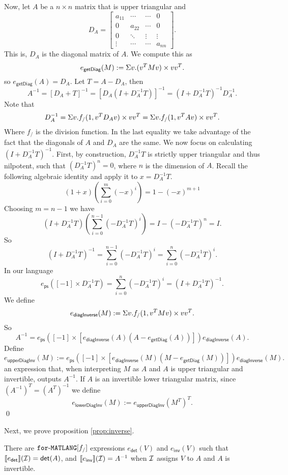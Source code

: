 Now, let $A$ be a $n\times n$ matrix that is upper triangular and
\[
D_A = \begin{bmatrix}
    a_{11} & \cdots & \cdots &  0 \\
    0 & a_{22} & \cdots &  0 \\
    0 & \ddots & \vdots & \vdots \\
    \vdots & \cdots& \cdots & a_{nn}
\end{bmatrix}.
\]
This is, $D_A$ is the diagonal matrix of $A$. We compute this as
$$
e_{\mathsf{getDiag}}(M) := \Sigma v. (v^TMv) \times vv^T.
$$
so $e_{\mathsf{getDiag}}(A)=D_A$.
Let $T=A-D_A$, then
$$
A^{-1}=\left[ D_A+T \right]^{-1}= \left[ D_A\left( I+D_A^{-1}T\right) \right]^{-1} = \left( I+D_A^{-1}T\right)^{-1}D_A^{-1}.
$$
Note that
$$
D_A^{-1}=\Sigma v. f_{/}(1,v^TD_Av)\times vv^T=\Sigma v. f_{/}(1,v^TAv)\times vv^T.
$$
Where $f_{/}$ is the division function. In the last equality we take advantage of the fact that the diagonals of $A$ and $D_A$ are the same.
We now focus on calculating $\left( I+D_A^{-1}T\right)^{-1}$. First, by construction, $D_A^{-1}T$ is strictly upper triangular and thus nilpotent, 
such that $\left( D_A^{-1}T\right)^n=0$, where $n$ is the dimension of $A$.
Recall the following algebraic identity and apply it to $x=D_A^{-1}T$. $$(1+x)\left( \sum_{i=0}^{m}(-x)^i \right)=1-(-x)^{m+1}$$
Choosing $m=n-1$ we have
$$
\left(I+D_A^{-1}T \right)\left( \sum_{i=0}^{n-1}(-D_A^{-1}T)^i \right)=I- \left( -D_A^{-1}T\right)^n =I.
$$
So
$$
\left(I+D_A^{-1}T \right)^{-1}=\sum_{i=0}^{n-1}(-D_A^{-1}T)^i=\sum_{i=0}^{n}(-D_A^{-1}T)^i.
$$
In our language
$$
e_{\mathsf{ps}}([-1]\times D_A^{-1}T)=\sum_{i=0}^{n}(-D_A^{-1}T)^i=\left(I+D_A^{-1}T \right)^{-1}.
$$
We define
$$
e_{\mathsf{diagInverse}}(M):=\Sigma v. f_{/}(1,v^TMv)\times vv^T.
$$
So
$$
A^{-1}= e_{\mathsf{ps}}\left([-1]\times \left[e_{\mathsf{diagInverse}}(A)(A-e_{\mathsf{getDiag}}(A))\right] \right)e_{\mathsf{diagInverse}}(A).
$$
Define
$$
e_{\mathsf{upperDiagInv}}(M):= e_{\mathsf{ps}}\left([-1]\times \left[e_{\mathsf{diagInverse}}(M)(M-e_{\mathsf{getDiag}}(M))\right] \right)e_{\mathsf{diagInverse}}(M).
$$
an expression that, when interpreting $M$ as $A$ and $A$ is upper triangular and invertible, outputs $A^{-1}$.
If $A$ is an invertible lower triangular matrix, since $\left(A^{-1}\right)^T=\left(A^T\right)^{-1}$ we define
$$
e_{\mathsf{lowerDiagInv}}(M):= e_{\mathsf{upperDiagInv}}(M^T)^T.
$$
\qed

Next, we prove proposition \ref{prop:inverse}.

\begin{INVERSE}
  There are $\texttt{for}\text{-}\texttt{MATLANG}[f_/]$ expressions $e_{\mathsf{det}}(V)$ and $e_{\mathsf{inv}}(V)$ such that
  $\llbracket e_{\mathsf{det}} \rrbracket(\mathcal{I})=\mathsf{det}(A)$, and  
  $\llbracket e_{\mathsf{inv}} \rrbracket(\mathcal{I})=A^{-1}$ when $\mathcal{I}$ assigns $V$
  to $A$ and $A$ is invertible.
\end{INVERSE}

